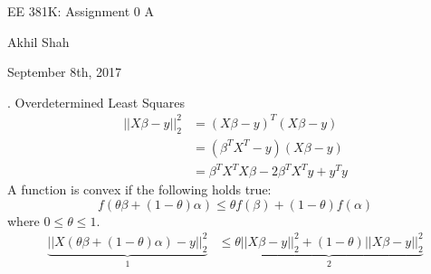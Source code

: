 \documentclass{article}
\begin{document}
\begin{center}
	{\huge EE 381K: Assignment 0 A}
\end{center}
\begin{center}
	Akhil Shah
\end{center}
\begin{center}
	September 8th, 2017
\end{center}

. Overdetermined Least Squares \newline
\begin{align*}
	||X\beta - y||_{2}^{2} &= (X\beta - y)^T(X\beta - y) \\
	&= (\beta^TX^T - y)(X\beta - y) \\
	&= \beta^TX^TX\beta - 2\beta^TX^Ty + y^Ty
\end{align*}
A function is convex if the following holds true:
\begin{equation}
	f(\theta\beta + (1-\theta)\alpha) \leq \theta f(\beta) + (1-\theta)f(\alpha)
\end{equation}
where $ 0 \leq \theta \leq 1 $. 
\begin{align*}
	\underbrace{||X(\theta\beta + (1-\theta)\alpha) - y||_{2}^{2}}_1 &\leq \underbrace{\theta||X\beta - y||^2_2 + (1 - \theta)||X\beta - y||^2_2}_2 \\
\end{align*}
\end{document}
